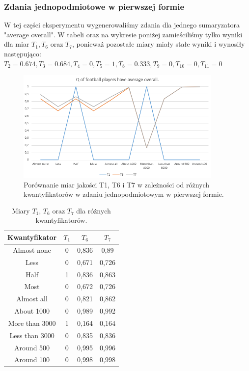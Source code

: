 \documentclass{classrep}
\begin{document}
	\subsubsection{Zdania jednopodmiotowe w pierwszej formie}
	W tej części eksperymentu wygenerowaliśmy zdania dla jednego sumaryzatora "average overall".
	W tabeli oraz na wykresie poniżej zamieściliśmy tylko wyniki dla miar $T_1, T_6$ oraz $T_7$, ponieważ pozostałe miary miały stałe wyniki i wynosiły następująco: $T_2 = 0.674, T_3 = 0.684, T_4 = 0, T_5 = 1, T_8 = 0.333, T_9 = 0, T_{10} = 0, T_{11} = 0 $
	
	\begin{figure}[h!]
		\centering
		\includegraphics[width=0.9\textwidth]{ex/1.png}
		\caption{Porównanie miar jakości T1, T6 i T7 w zależności od różnych kwantyfikatorów w zdaniu jednopodmiotowym w pierwszej formie.}
		\label{wyniki1}
	\end{figure}
\begin{table}[h!]
	\centering
	\begin{tabular} {c c c c}
		\hline
		\textbf{Kwantyfikator} & \textbf{$T_1$} & \textbf{$T_6$} & \textbf{$T_7$} \\ [0.5ex] 
		\hline	
		\hline 
		Almost none	& 0 &	0,836 &	0,89 \\
		Less	& 0	& 0,671	& 0,726 \\
		Half	& 1 &	0,836	& 0,863 \\
		Most	& 0 &	0,672	& 0,726 \\ 
		Almost all &	0&	0,821	& 0,862 \\ 
		About 1000	& 0 &	0,989	& 0,992 \\ 
		More than 3000	& 1 &	0,164 &	0,164 \\ 
		Less than 3000	& 0 &	0,835 &	0,836 \\ 
		Around 500	& 0 &	0,995	& 0,996 \\ 
		Around 100	& 0 &	0,998	& 0,998	\\ 					
		\hline			
	\end{tabular}
	\caption{Miary $T_1$, $T_6$ oraz $T_7$ dla różnych kwantyfikatorów. }
	\label{tabelaex1}
\end{table}
	\newpage
\end{document}
